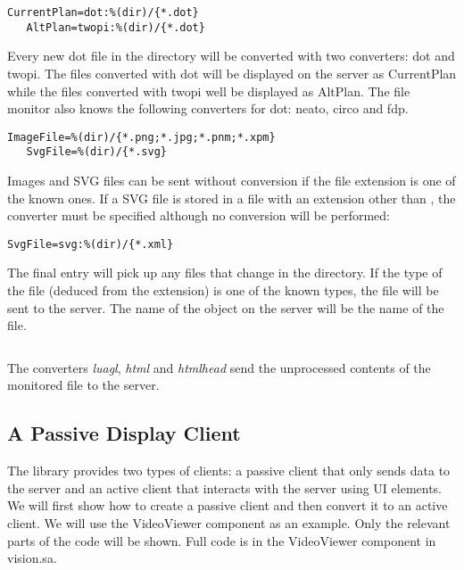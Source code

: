 \begin{Verbatim}[fontsize=\scriptsize,gobble=3]
   CurrentPlan=dot:%(dir)/{*.dot}
   AltPlan=twopi:%(dir)/{*.dot}
\end{Verbatim}

Every new dot file in the directory will be converted with two converters: dot
and twopi. The files converted with dot will be displayed on the server as
CurrentPlan while the files converted with twopi well be displayed as AltPlan.
The file monitor also knows the following converters for dot: neato, circo and
fdp.

\begin{Verbatim}[fontsize=\scriptsize,gobble=3]
   ImageFile=%(dir)/{*.png;*.jpg;*.pnm;*.xpm}
   SvgFile=%(dir)/{*.svg}
\end{Verbatim}

Images and SVG files can be sent without conversion if the file extension is
one of the known ones. If a SVG file is stored in a file with an extension
other than , the converter must be specified although no conversion
will be performed:

\begin{Verbatim}[fontsize=\scriptsize,gobble=3]
   SvgFile=svg:%(dir)/{*.xml}
\end{Verbatim}

The final entry will pick up any files that change in the directory. If the
type of the file (deduced from the extension) is one of the known types, the
file will be sent to the server. The name of the object on the server will be
the name of the file.

\begin{Verbatim}[fontsize=\scriptsize,gobble=3]
   %(dir)/{*}"
\end{Verbatim}

The converters {\em luagl}, {\em html} and {\em htmlhead} send the unprocessed
contents of the monitored file to the server.

\subsection{A Passive Display Client}

The library provides two types of clients: a passive client that only sends
data to the server and an active client that interacts with the server using UI
elements. We will first show how to create a passive client and then convert it
to an active client. We will use the VideoViewer component as an example. Only
the relevant parts of the code will be shown. Full code is in the VideoViewer
component in vision.sa.

